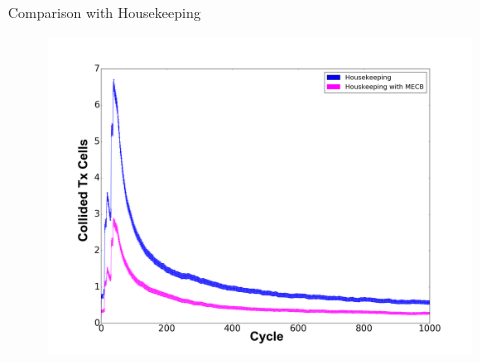 \begin{withoutheadline}
\begin{frame}{Comparison with Housekeeping }

\begin{figure}[p]

\includegraphics[width=\linewidth]{figures/Graph3.png}
\end{figure}



\end{frame}
\end{withoutheadline}



